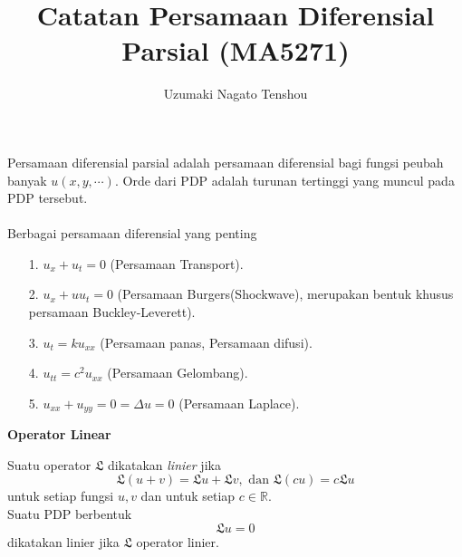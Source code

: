 \documentclass[11pt,a4paper]{article}
\author{Uzumaki Nagato Tenshou}
\title{Catatan Persamaan Diferensial Parsial (MA5271)}
\theoremstyle{plain}
\theoremstyle{definition}
\theoremstyle{remark}
\newcommand{\R}{\mathbb{R}}
\newcommand{\LL}{\mathfrak{L}}
\begin{document}
\maketitle
\pagestyle{fancy}

Persamaan diferensial parsial adalah persamaan diferensial bagi fungsi peubah banyak $u(x,y,\cdots)$. Orde dari PDP adalah turunan tertinggi yang muncul pada PDP tersebut. \\
\\
Berbagai persamaan diferensial yang penting
\begin{enumerate}
	\item[1.] $u_{x}+u_{t}=0$ (Persamaan Transport).
	\item[2.] $u_{x}+u u_{t}=0$ (Persamaan Burgers(Shockwave), merupakan bentuk khusus persamaan Buckley-Leverett).
	\item[3.] $u_{t} = k u_{xx}$ (Persamaan panas, Persamaan difusi).
	\item[4.] $u_{tt}=c^{2}u_{xx}$ (Persamaan Gelombang).
	\item[5.] $u_{xx}+u_{yy}=0=\Delta u = 0$ (Persamaan Laplace).
\end{enumerate}



\begin{flushleft}
	\textbf{Operator Linear}
\end{flushleft}
 Suatu operator $\LL$ dikatakan \textit{linier} jika
 $$\LL(u+v)=\LL u+\LL v, \text{ dan } \LL(cu) = c\LL u$$
 untuk setiap fungsi $u,v$ dan untuk setiap $c\in \R$.\\
 Suatu PDP berbentuk $$\LL u=0$$ dikatakan linier jika $\LL$ operator linier.
\end{document}

